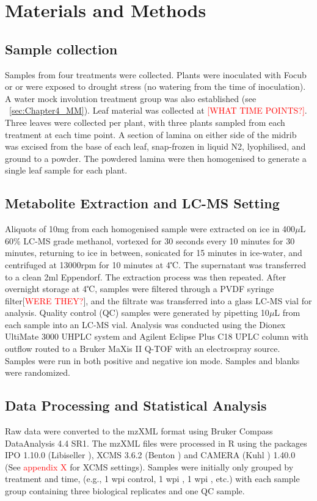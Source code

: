 \section{Materials and Methods}

\subsection{Sample collection}
Samples from four treatments were collected. Plants were inoculated with \ac{Focub} or \Xvm or were exposed to drought stress (no watering from the time of inoculation). A water mock involution treatment group was also established (see ~\ref{sec:Chapter4_MM}). 
Leaf material was collected at \textcolor{red}{[WHAT TIME POINTS?]}. Three leaves were collected per plant, with three plants sampled from each treatment at each time point. A section of lamina on either side of the midrib was excised from the base of each leaf, snap-frozen in liquid N2, lyophilised, and ground to a powder. The powdered lamina were then homogenised to generate a single leaf sample for each plant. 

\subsection{Metabolite Extraction and LC-MS Setting}
Aliquots of 10mg from each homogenised sample were extracted on ice in 400\(\mu\)L 60\% LC-MS grade methanol, vortexed for 30 seconds every 10 minutes for 30 minutes, returning to ice in between, sonicated for 15 minutes in ice-water, and centrifuged at 13000rpm for 10 minutes at 4℃. The supernatant was transferred to a clean 2ml Eppendorf. The extraction process was then repeated. After overnight storage at 4℃, samples were filtered through a PVDF syringe filter[\textcolor{red}{WERE THEY?}], and the filtrate was transferred into a glass LC-MS vial for analysis. Quality control (QC) samples were generated by pipetting 10\(\mu\)L from each sample into an LC-MS vial. Analysis was conducted using the Dionex UltiMate 3000 UHPLC system and Agilent Eclipse Plus C18 UPLC column with outflow routed to a Bruker MaXis II Q-TOF with an electrospray source. Samples were run in both positive and negative ion mode. Samples and blanks were randomized.

\subsection{Data Processing and Statistical Analysis}
Raw data were converted to the mzXML format using Bruker Compass DataAnalysis 4.4 SR1. The mzXML files were processed in R using the packages IPO 1.10.0 (Libiseller ), XCMS 3.6.2 (Benton ) and CAMERA (Kuhl ) 1.40.0 (See \textcolor{red}{appendix X} for XCMS settings). Samples were initially only grouped by treatment and time, (e.g., 1 wpi control, 1 wpi \Foc, 1 wpi \Xvm, etc.) with each sample group containing three biological replicates and one QC sample. 

